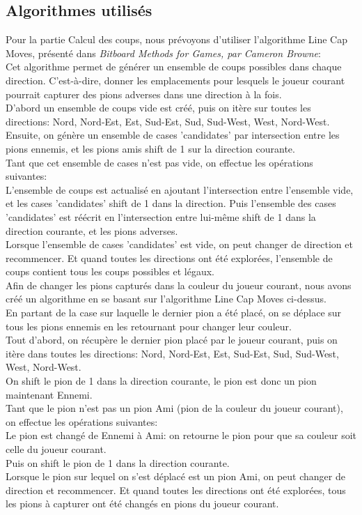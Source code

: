 \documentclass[a4paper,12pt]{article}
\begin{document}
\subsection{Algorithmes utilisés}

Pour la partie Calcul des coups, nous prévoyons d'utiliser l'algorithme Line
Cap Moves, présenté dans \textit{Bitboard Methods for Games, par Cameron
  Browne}:\\ Cet algorithme permet de générer un ensemble de coups possibles dans
chaque direction. C'est-à-dire, donner les emplacements pour lesquels le joueur
courant pourrait capturer des pions adverses dans une direction à la fois.\\
D'abord un ensemble de coups vide est créé, puis on itère sur toutes les
directions: Nord, Nord-Est, Est, Sud-Est, Sud, Sud-West, West, Nord-West.\\
Ensuite, on génère un ensemble de cases 'candidates' par intersection entre les
pions ennemis, et les pions amis shift de 1 sur la direction courante.\\ Tant
que cet ensemble de cases n'est pas vide, on effectue les opérations
suivantes:\\ L'ensemble de coups est actualisé en ajoutant l'intersection entre
l'ensemble vide, et les cases 'candidates' shift de 1 dans la direction. Puis
l'ensemble des cases 'candidates' est réécrit en l'intersection entre lui-même
shift de 1 dans la direction courante, et les pions adverses.\\ Lorsque
l'ensemble de cases 'candidates' est vide, on peut changer de direction et
recommencer. Et quand toutes les directions ont été explorées, l'ensemble de
coups contient tous les coups possibles et légaux.\\

Afin de changer les pions capturés dans la couleur du joueur courant, nous
avons créé un algorithme en se basant sur l'algorithme Line Cap Moves
ci-dessus.\\ En partant de la case sur laquelle le dernier pion a été placé, on
se déplace sur tous les pions ennemis en les retournant pour changer leur
couleur.\\ Tout d'abord, on récupère le dernier pion placé par le joueur
courant, puis on itère dans toutes les directions: Nord, Nord-Est, Est,
Sud-Est, Sud, Sud-West, West, Nord-West.\\ On shift le pion de 1 dans la
direction courante, le pion est donc un pion maintenant Ennemi.\\ Tant que le
pion n'est pas un pion Ami (pion de la couleur du joueur courant), on effectue
les opérations suivantes:\\ Le pion est changé de Ennemi à Ami: on retourne le
pion pour que sa couleur soit celle du joueur courant.\\ Puis on shift le pion
de 1 dans la direction courante.\\ Lorsque le pion sur lequel on s'est déplacé
est un pion Ami, on peut changer de direction et recommencer. Et quand toutes
les directions ont été explorées, tous les pions à capturer ont été changés en
pions du joueur courant.\\
\end{document}
